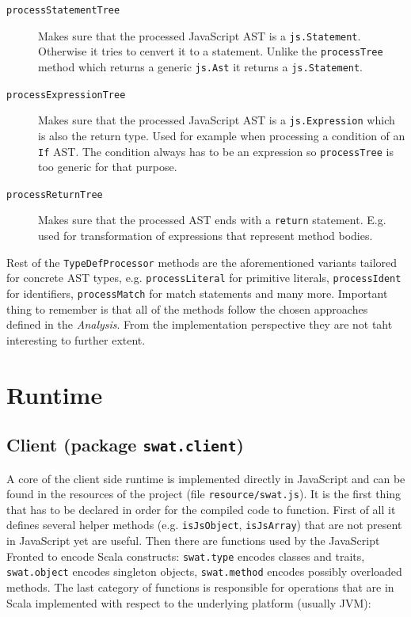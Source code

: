 \documentclass[12pt,a4paper]{report}
\begin{document}
\begin{description}
\item[\texttt{processStatementTree}] Makes sure that the processed JavaScript AST is a \texttt{js.Statement}. Otherwise it tries to cenvert it to a statement. Unlike the \texttt{processTree} method which returns a generic \texttt{js.Ast} it returns a \texttt{js.Statement}.
\item[\texttt{processExpressionTree}] Makes sure that the processed JavaScript AST is a \texttt{js.Expression} which is also the return type. Used for example when processing a condition of an \texttt{If} AST. The condition always has to be an expression so \texttt{processTree} is too generic for that purpose.
\item[\texttt{processReturnTree}] Makes sure that the processed AST ends with a \texttt{return} statement. E.g. used for transformation of expressions that represent method bodies.
\end{description}

Rest of the \texttt{TypeDefProcessor} methods are the aforementioned variants tailored for concrete AST types, e.g. \texttt{processLiteral} for primitive literals, \texttt{processIdent} for identifiers, \texttt{processMatch} for match statements and many more. Important thing to remember is that all of the methods follow the chosen approaches defined in the {\it Analysis}. From the implementation perspective they are not taht interesting to further extent.

\section{Runtime}

\subsection{Client (package \texttt{swat.client})}

A core of the client side runtime is implemented directly in JavaScript and can be found in the resources of the project (file \texttt{resource/swat.js}). It is the first thing that has to be declared in order for the compiled code to function. First of all it defines several helper methods (e.g. \texttt{isJsObject}, \texttt{isJsArray}) that are not present in JavaScript yet are useful. Then there are functions used by the JavaScript Fronted to encode Scala constructs: \texttt{swat.type} encodes classes and traits, \texttt{swat.object} encodes singleton objects, \texttt{swat.method} encodes possibly overloaded methods. The last category of functions is responsible for operations that are in Scala implemented with respect to the underlying platform (usually JVM):
\end{document}

